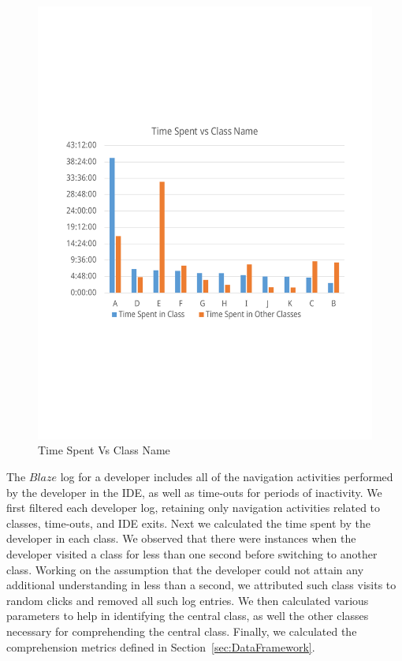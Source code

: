 \begin{figure}
\includegraphics[width=\columnwidth]{ForPaper}
\caption{Time Spent Vs Class Name}
\label{fig:ForPaper}
\vspace*{-6mm}
\end{figure}

The $Blaze$ log for a developer includes all of the navigation activities performed by the developer in the IDE, as well as time-outs for periods of inactivity. We first filtered each developer log, retaining only navigation activities related to classes, time-outs, and IDE exits. Next we calculated the time spent by the developer in each class. We observed that there were instances when the developer visited a class for less than one second before switching to another class. Working on the assumption that the developer could not attain any additional understanding in less than a second,  we attributed such class visits to random clicks and removed all such log entries. We then calculated various parameters to help in identifying the central class, as well the other classes necessary for comprehending the central class.   Finally, we calculated the comprehension metrics defined in Section~\ref{sec:DataFramework}.

